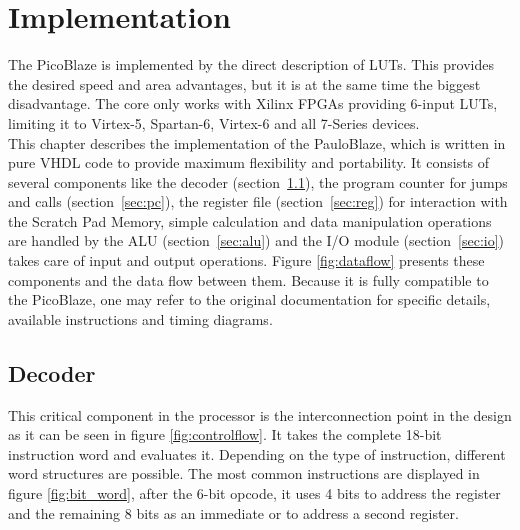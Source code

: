 \chapter{Implementation}
\label{ch:impl}

The PicoBlaze is implemented by the direct description of LUTs.
This provides the desired speed and area advantages, but it is at the same time the biggest disadvantage.
The core only works with Xilinx FPGAs providing 6-input LUTs, limiting it to Virtex-5, Spartan-6, Virtex-6 and all 7-Series devices.
\\
This chapter describes the implementation of the PauloBlaze, which is written in pure VHDL code to provide maximum flexibility and portability.
It consists of several components like the decoder (section~\ref{sec:decoder}), the program counter for jumps and calls (section~\ref{sec:pc}), the register file (section~\ref{sec:reg}) for interaction with the Scratch Pad Memory, simple calculation and data manipulation operations are handled by the ALU (section~\ref{sec:alu}) and the I/O module (section~\ref{sec:io}) takes care of input and output operations.
Figure \ref{fig:dataflow} presents these components and the data flow between them.
Because it is fully compatible to the PicoBlaze, one may refer to the original documentation \cite{KCPSM6} for specific details, available instructions and timing diagrams.

\section{Decoder}
\label{sec:decoder}
This critical component in the processor is the interconnection point in the design as it can be seen in figure \ref{fig:controlflow}.
It takes the complete 18-bit instruction word and evaluates it.
Depending on the type of instruction, different word structures are possible.
The most common instructions are displayed in figure \ref{fig:bit_word}, after the 6-bit opcode, it uses 4 bits to address the register and the remaining 8 bits as an immediate or to address a second register.

